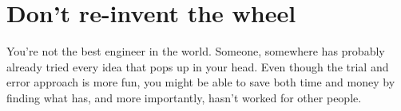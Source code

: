 \documentclass[12pt,a4paper]{article}
\begin{document}
\section{Don't re-invent the wheel}
You're not the best engineer in the world. Someone, somewhere has probably already tried every idea that pops up in your head. Even though the trial and error approach is more fun, you might be able to save both time and money by finding what has, and more importantly, hasn't worked for other people.
\end{document}
